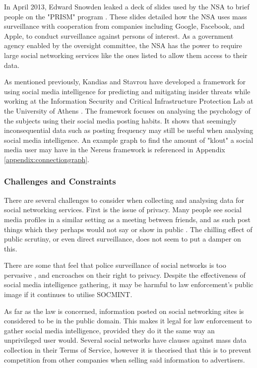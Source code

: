 \documentclass[12pt]{article}
\begin{document}
In April 2013, Edward Snowden leaked a deck of slides used by the NSA to brief people on the "PRISM" program \citep{prismslides}. These slides detailed how the NSA uses mass surveillance with cooperation from companies including Google, Facebook, and Apple, to conduct surveillance against persons of interest. As a government agency enabled by the oversight committee, the NSA has the power to require large social networking services like the ones listed to allow them access to their data.

As mentioned previously, Kandias and Stavrou have developed a framework for using social media intelligence for predicting and mitigating insider threats while working at the Information Security and Critical Infrastructure Protection Lab at the University of Athens \citep{behaviourdetection}. The framework focuses on analysing the psychology of the subjects using their social media posting habits. It shows that seemingly inconsequential data such as posting frequency may still be useful when analysing social media intelligence. An example graph to find the amount of "klout" a social media user may have in the Nereus framework is referenced in Appendix \ref{appendix:connectiongraph}.

\subsubsection{Challenges and Constraints}
There are several challenges to consider when collecting and analysing data for social networking services. First is the issue of privacy. Many people see social media profiles in a similar setting as a meeting between friends, and as such post things which they perhaps would not say or show in public \citep{socialmediacontent}. The chilling effect of public scrutiny, or even direct surveillance, does not seem to put a damper on this.

There are some that feel that police surveillance of social networks is too pervasive \citep{socmintlawenforcement}, and encroaches on their right to privacy. Despite the effectiveness of social media intelligence gathering, it may be harmful to law enforcement's public image if it continues to utilise SOCMINT.

As far as the law is concerned, information posted on social networking sites is considered to be in the public domain. This makes it legal for law enforcement to gather social media intelligence, provided they do it the same way an unprivileged user would. Several social networks have clauses against mass data collection in their Terms of Service, however it is theorised that this is to prevent competition from other companies when selling said information to advertisers.
\end{document}
